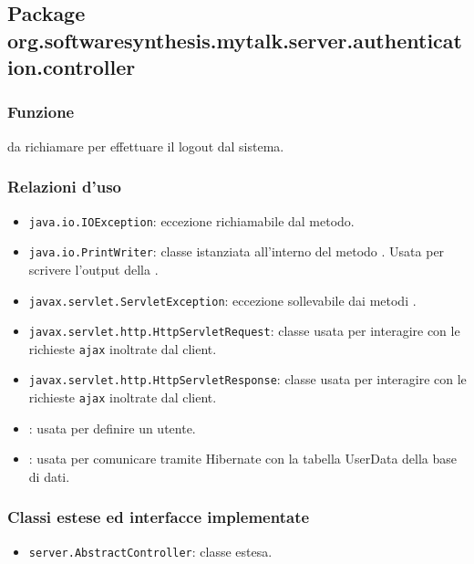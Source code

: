 \subsection{Package org.softwaresynthesis.mytalk.server.authentication.controller}\label{sec:autservlet}


\subsubsection*{Funzione}
 da richiamare per effettuare il logout dal sistema.

\subsubsection*{Relazioni d'uso}
\begin{itemize}
	\item \texttt{java.io.IOException}: eccezione richiamabile dal metodo.
	\item \texttt{java.io.PrintWriter}: classe istanziata all'interno del metodo . Usata per scrivere l'output della .
	\item \texttt{javax.servlet.ServletException}: eccezione sollevabile dai metodi .
	\item \texttt{javax.servlet.http.HttpServletRequest}: classe usata per interagire con le richieste \texttt{ajax} inoltrate dal client.
	\item \texttt{javax.servlet.http.HttpServletResponse}: classe usata per interagire con le richieste \texttt{ajax} inoltrate dal client.
	\item {}: usata per definire un utente.
	\item {}: usata per comunicare tramite Hibernate con la tabella UserData della base di dati.
\end{itemize}

\subsubsection*{Classi estese ed interfacce implementate}
\begin{itemize}
	\item \texttt{server.AbstractController}: classe estesa.
\end{itemize}

